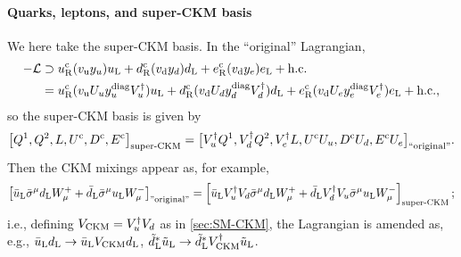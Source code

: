 \documentclass[CheatSheet]{subfiles}
\begin{document}
\paragraph{Quarks, leptons, and super-CKM basis}
We here take the super-CKM basis.
In the ``original'' Lagrangian,
\begin{align}
 -\mathcal L&\supset
   u_{\mathrm{R}}^{\mathrm{c}} (v_{\mathrm{u}} y_{u})u_{\mathrm{L}}
  +d_{\mathrm{R}}^{\mathrm{c}} (v_{\mathrm{d}} y_{d})d_{\mathrm{L}}
  +e_{\mathrm{R}}^{\mathrm{c}} (v_{\mathrm{d}} y_{e})e_{\mathrm{L}} + \text{h.c.}
 \\
&=
   u_{\mathrm{R}}^{\mathrm{c}} (v_{\mathrm{u}} U_u y_{u}^{\mathrm{diag}} V_u^\dagger)u_{\mathrm{L}}
  +d_{\mathrm{R}}^{\mathrm{c}} (v_{\mathrm{d}} U_d y_{d}^{\mathrm{diag}} V_d^\dagger)d_{\mathrm{L}}
  +e_{\mathrm{R}}^{\mathrm{c}} (v_{\mathrm{d}} U_e y_{e}^{\mathrm{diag}} V_e^\dagger)e_{\mathrm{L}} + \text{h.c.},
\end{align}
so the super-CKM basis is given by
\begin{equation}
 \bigl[
 Q^1, Q^2, L, U^{\mathrm{c}}, D^{\mathrm{c}}, E^{\mathrm{c}}
\bigr]_{\text{super-CKM}} =
 \bigl[
 V_u^\dagger Q^1, V_d^\dagger Q^2, V_e^\dagger L, U^{\mathrm{c}} U_u, D^{\mathrm{c}} U_d, E^{\mathrm{c}} U_e
\bigr]_{\text{``original''}}.
\end{equation}
Then the CKM mixings appear as, for example,
\begin{equation}
 \left[\bar u_{\mathrm{L}}\bar\sigma^\mu d_{\mathrm{L}} W^+_\mu + \bar d_{\mathrm{L}}\bar\sigma^\mu u_{\mathrm{L}} W^-_\mu\right]_{\text{''original''}}
=
 \left[\bar u_{\mathrm{L}} V_u^\dagger V_d \bar\sigma^\mu d_{\mathrm{L}} W^+_\mu + \bar d_{\mathrm{L}} V_d^\dagger V_u\bar\sigma^\mu u_{\mathrm{L}} W^-_\mu\right]_{\text{super-CKM}};
\end{equation}
i.e., defining $V_{\mathrm{CKM}} = V_u^\dagger V_d$ as in \cref{sec:SM-CKM},
the Lagrangian is amended as, e.g., $\bar u_{\mathrm{L}}d_{\mathrm{L}}\to \bar u_{\mathrm{L}} V_{\mathrm{CKM}}d_{\mathrm{L}}$, $\tilde d_{\mathrm{L}}^*\tilde u_{\mathrm{L}}\to \tilde d_{\mathrm{L}}^* V^\dagger_{\mathrm{CKM}}\tilde u_{\mathrm{L}}$.
\end{document}
